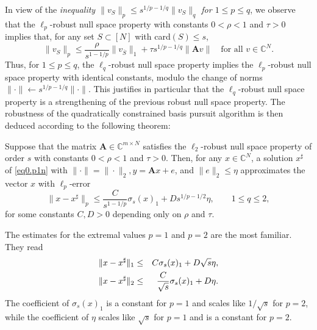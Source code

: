 In view of the \emph{\textcolor[rgb]{1,0,0}{inequality $\|v_S\|_p \leq s^{1/p-1/q}\|v_S\|_q$ for $1 \leq p \leq q$}}, we observe that the $\ell_p$-robust null space property with constants $ 0 <\rho < 1$ and $\tau > 0$ implies that, for any set $S \subset [N]$ with card$(S) \leq s$,
\[
    \|v_S\|_p \leq \frac{\rho}{s^{1-1/p}} \|v_{\overline{S}}\|_1 + \tau s^{1/p-1/q}\|\mathbf{A}v\| \quad \text{for all } v \in \mathbb{C}^N.
\]
Thus, for $1 \leq p \leq q$, the $\ell_q$-robust null space property implies the $\ell_p$-robust null space property with identical constants, modulo the change of norms $\|\cdot\| \leftarrow s^{1/p - 1/q}\|\cdot\|$. \textcolor[rgb]{1,0,0}{This justifies in particular that the $\ell_q$-robust null space property is a strengthening of the previous robust null space property}. The robustness of the quadratically constrained basis pursuit algorithm is then deduced according to the following theorem:
\begin{theorem}
    \label{th0.4.22}
    Suppose that the matrix $\mathbf{A} \in \mathbb{C}^{m \times N}$ satisfies the $\ell_2$-robust null space property of order $s$ with constants $0 <\rho <1$ and $\tau > 0$. Then, for any $x \in \mathbb{C}^N$, a solution $x^{\sharp}$ of \cref{eq0.p1n} with $\|\cdot\| = \|\cdot\|_2, y = \mathbf{A}x + e$, and $\|e\|_2 \leq \eta$ approximates the vector $x$ with $\ell_p$-error
    \begin{equation}
        \|x-x^{\sharp}\|_p \leq \frac{C}{s^{1-1/p}} \sigma_s(x)_1 + D s^{1/p-1/2}\eta, \qquad 1 \leq q \leq 2,
        \label{eq0.4.15}
    \end{equation}
    for some constants $C,D>0$ depending only on $\rho$ and $\tau$.
\end{theorem}

The estimates for the extremal values $p=1$ and $p=2$ are the most familiar. They read
\begin{eqnarray}
    \label{eqn0.4.16}
    \|x - x^{\sharp}\|_1 &\leq& C \sigma_s(x)_1 + D \sqrt{s}\eta, \notag \\
    \|x-x^{\sharp}\|_2 &\leq& \frac{C}{\sqrt{s}} \sigma_s(x)_1 + D \eta.
\end{eqnarray}
The coefficient of $\sigma_s(x)_1$ \textcolor[rgb]{1,0,0}{is a constant for $p=1$ and scales like $1/\sqrt{s}$ for $p=2$}, while the coefficient of $\eta$ \textcolor[rgb]{1,0,0}{scales like $\sqrt{s}$ for $p=1$ and is a constant for $p=2$}. 

